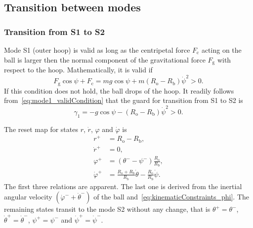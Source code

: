 \documentclass{ifacconf}
\begin{document}
\subsection{Transition between modes} %
\label{sub:transition_between_the_modes}

\subsubsection{Transition from S1 to S2} %
Mode S1 (outer hoop) is valid as long as the centripetal force $F_\mathrm{c}$ acting on the ball is larger then the normal component of the gravitational force $F_\mathrm{g}$ with respect to the hoop. Mathematically, it is valid if
\begin{equation}
\label{eq:mode1_validCondition}
  F_\mathrm{g}\cos\psi + F_\mathrm{c} = m g \cos\psi +  m\left( R_\mathrm{o} - R_\mathrm{b}\right)\dot{\psi}^2 > 0.
\end{equation}
If this condition does not hold, the ball drops of the hoop. It readily follows from~\eqref{eq:mode1_validCondition} that the guard for transition from S1 to S2 is
\begin{equation}
  \gamma_1  = - g \cos \psi -  \left( R_\mathrm{o} - R_\mathrm{b}\right)\dot{\psi}^2 > 0.
\end{equation}

The reset map for states $r$, $\dot{r}$, $\varphi$ and $\dot{\varphi}$ is
\begin{subequations}
\label{eq:resetMapS1_to_S2}
\begin{align}
  r^+            &= R_\mathrm{o}-R_\mathrm{b}, \\
  \dot{r}^+      &=   0, \\
  \varphi^+      &=   (\theta^- - \psi^-)\frac{R_\mathrm{o}}{R_\mathrm{b}}, \\
\label{eq:resetMapS1_to_S2_Dphi}  \dot{\varphi}^+  &= \frac{R_\mathrm{o}+R_\mathrm{b}}{R_\mathrm{b}}\dot{\theta} - \frac{R_\mathrm{o}}{R_\mathrm{b}}\dot{\psi}.
\end{align}
\end{subequations}
The first three relations are apparent. The last one is derived from the inertial angular velocity $(\dot{\varphi}^- + \dot{\theta}^-)$ of the ball and~\eqref{eq:kinematicConstraints_phi}. The remaining states transit to the mode S2 without any change, that is $\theta^+=\theta^-$, $\dot{\theta}^+=\dot{\theta}^-$, $\psi^+=\psi^-$ and $\dot{\psi}^+=\dot{\psi}^-$.
\end{document}
